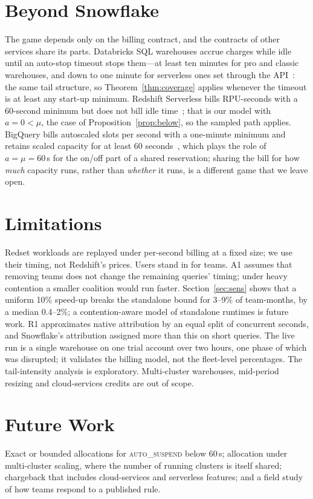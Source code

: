 \documentclass[sigconf]{acmart}
\newcommand{\autos}{\textsc{auto\_suspend}}
\begin{document}
\section{Beyond Snowflake}\label{sec:beyond}
The game depends only on the billing contract, and the contracts of other services share its parts. Databricks SQL
warehouses accrue charges while idle until an auto-stop timeout stops them---at least ten minutes for pro and classic
warehouses, and down to one minute for serverless ones set through the API~\cite{dbx-warehouse}: the same tail structure, so Theorem~\ref{thm:coverage} applies whenever the timeout is at
least any start-up minimum. Redshift Serverless bills RPU-seconds with a 60-second minimum but does not bill idle
time~\cite{rs-serverless}; that is our model with $a = 0 < \mu$, the case of Proposition~\ref{prop:below}, so the sampled path
applies. BigQuery bills autoscaled slots per second with a one-minute minimum and retains scaled capacity for at least 60
seconds~\cite{bq-autoscale}, which plays the role of $a = \mu = 60$\,s for the on/off part of a shared reservation; sharing
the bill for how \emph{much} capacity runs, rather than \emph{whether} it runs, is a different game that we leave open.

\section{Limitations}
Redset workloads are replayed under per-second billing at a fixed size; we use their timing, not Redshift's prices. Users
stand in for teams. A1 assumes that removing teams does not change the remaining queries' timing; under heavy contention a
smaller coalition would run faster. Section~\ref{sec:sens} shows that a uniform 10\% speed-up breaks the standalone bound
for 3--9\% of team-months, by a median 0.4--2\%; a contention-aware model of standalone runtimes is future work. R1 approximates native attribution by an
equal split of concurrent seconds, and Snowflake's attribution assigned more than this on short queries. The live run is a
single warehouse on one trial account over two hours, one phase of which was disrupted; it validates the billing model, not
the fleet-level percentages. The tail-intensity analysis is exploratory. Multi-cluster warehouses, mid-period resizing and
cloud-services credits are out of scope.

\section{Future Work}
Exact or bounded allocations for \autos{} below 60\,s; allocation under multi-cluster scaling, where the number of running
clusters is itself shared; chargeback that includes cloud-services and serverless features; and a field study of how teams
respond to a published rule.
\end{document}
